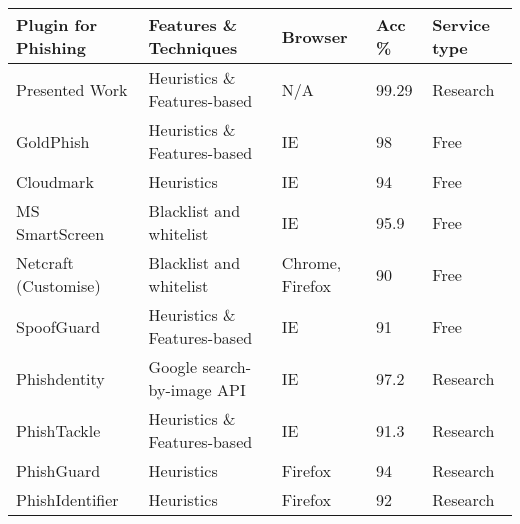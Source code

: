 \begin{singlespace}
    \small
    \begin{center}
        \label{tab:EXISTENT_SOLUTIONS_VS_ARTEFACT}
        \begin{tabular}{ | m{8em} | m{13em} | m{8.5em} | m{2.3em} | m{5em} | }
            \hline
            \textbf{Plugin for Phishing} & \textbf{Features \& Techniques}       & \textbf{Browser}    & \textbf{Acc \%} & \textbf{Service  type} \\
            \hline
            Presented Work               & Heuristics \& Features-based          & N/A                 & 99.29           & Research               \\
            \hline
            GoldPhish                    & Heuristics \& Features-based          & IE                  & 98              & Free                   \\
            \hline
            Cloudmark                    & Heuristics                            & IE                  & 94              & Free                   \\
            \hline
            MS SmartScreen               & Blacklist and whitelist               & IE                  & 95.9            & Free                   \\
            \hline
            Netcraft (Customise)         & Blacklist and whitelist               & Chrome, Firefox     & 90              & Free                   \\
            \hline
            SpoofGuard                   & Heuristics \& Features-based          & IE                  & 91              & Free                   \\
            \hline
            Phishdentity                 & Google search-by-image API            & IE                  & 97.2            & Research               \\
            \hline
            PhishTackle                  & Heuristics \& Features-based          & IE                  & 91.3            & Research               \\
            \hline
            PhishGuard                   & Heuristics                            & Firefox             & 94              & Research               \\
            \hline
            PhishIdentifier              & Heuristics                            & Firefox             & 92              & Research               \\
            \hline

\end{tabular}
\end{center}
\end{singlespace}
